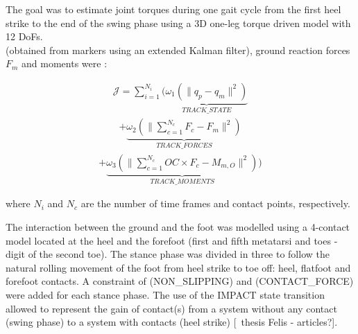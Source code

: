 The goal was to estimate joint torques  during one gait cycle from the first heel strike to the end of the swing phase using a 3D one-leg torque driven model with 12 DoFs.  \\

  (obtained from markers using an extended Kalman filter), ground reaction forces $F_m$ and moments  were :

\begin{eqnarray}
\label{eq:ocp_q}
\mathcal{J} = \sum_{i=1}^{N_i}\Bigg(\underbrace{\omega_1(\|q_p - q_m\|^{2})}_{TRACK\_STATE}
\label{eq:ocp_forces}
\end{eqnarray}
\begin{eqnarray}
+ \underbrace{\omega_2(\|\sum_{c=1}^{N_c}F_c - F_m\|^{2})}_{TRACK\_FORCES}
\end{eqnarray}
\begin{eqnarray}
\label{eq:ocp_moments}
+ \underbrace{\omega_3(\|\sum_{c=1}^{N_c}OC\times F_c - M_{m,O}\|^{2})}_{TRACK\_MOMENTS}\bigg) 
\end{eqnarray}

\noindent where $N_i$ and $N_c$ are the number of time frames and contact points, respectively. 

The interaction between the ground and the foot was modelled using a 4-contact  model located at the heel and the forefoot (first and fifth metatarsi and toes - digit of the second toe). 
The stance phase was divided in three to follow the natural rolling movement of the foot from heel strike to toe off: heel, flatfoot and forefoot contacts. 
A constraint of  (NON\_SLIPPING) and  (CONTACT\_FORCE) were added for each stance phase. 
The use of the IMPACT state transition allowed to represent the gain of contact(s) from a system without any contact (swing phase) to a system with contacts (heel strike) [\addref\ thesis Felis - articles?].  


